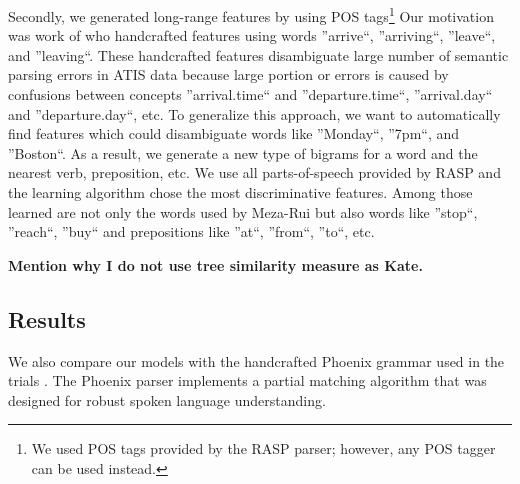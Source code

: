 \documentclass[11pt]{article}
\begin{document}
Secondly, we generated long-range features by using POS tags\footnote{We used POS tags provided by the RASP parser; however, any POS tagger can be used instead.} 
Our motivation was work of \cite{meza08a,meza08b} who handcrafted features using words ''arrive``, ''arriving``, ''leave``, and ''leaving``. These handcrafted features disambiguate large number of semantic parsing errors in ATIS data because large portion or errors is caused by confusions between concepts ''arrival.time`` and ''departure.time``, ''arrival.day`` and ''departure.day``, etc. To generalize this approach, we want to automatically find features which could disambiguate words like ''Monday``, ''7pm``, and ''Boston``. As a result, we generate a new type of bigrams for a word and the nearest verb, preposition, etc. We use all parts-of-speech provided by RASP and the learning algorithm chose the most discriminative features. Among those learned are not only the words used by Meza-Rui but also words like ''stop``, ''reach``, ''buy`` and prepositions like ''at``, ''from``, ''to``, etc.

\textbf{Mention why I do not use tree similarity measure as Kate.}

\subsection{Results}

We also compare our models with the handcrafted Phoenix grammar \cite{ward91} used in the trials \cite{williams07,thomson08}. The Phoenix parser implements a partial matching algorithm that was designed for robust spoken language understanding.
\end{document}
